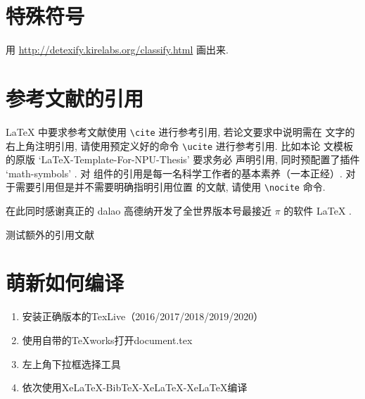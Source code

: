 \section{特殊符号}

用 \href{http://detexify.kirelabs.org/classify.html}{http://detexify.kirelabs.org/classify.html}
画出来.

\section{参考文献的引用}

\LaTeX{} 中要求参考文献使用 \lstinline`\cite` 进行参考引用, 若论文要求中说明需在
文字的右上角注明引用, 请使用预定义好的命令 \lstinline`\ucite` 进行参考引用. 比如本论
文模板的原版 `LaTeX-Template-For-NPU-Thesis'  要求务必
声明引用, 同时预配置了插件 `math-symbols' . 对
组件的引用是每一名科学工作者的基本素养（一本正经）. 对于需要引用但是并不需要明确指明引用位置
的文献, 请使用 \lstinline`\nocite` 命令.

在此同时感谢真正的 dalao 高德纳开发了全世界版本号最接近 $\pi$ 的软件 \LaTeX{}
\nocite{lamport1989latex:}.

测试额外的引用文献 

\section{萌新如何编译}
\begin{enumerate}
\setlength{\itemsep}{0pt}
    \item 安装正确版本的TexLive（2016/2017/2018/2019/2020）
    \item 使用自带的TeXworks打开document.tex
	\item 左上角下拉框选择工具
    \item 依次使用XeLaTeX-BibTeX-XeLaTeX-XeLaTeX编译
\end{enumerate}

\endinput




